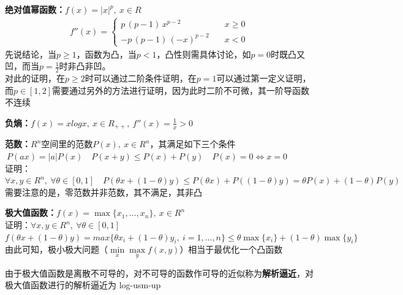 \documentclass[11pt]{ctexart}         %
\begin{document}
\textbf{绝对值幂函数：}$f(x)=\vert x\vert^p,\ x\in R$
\begin{align*}
	f''(x)=
	\begin{cases}
		p\,(p-1)\,x^{p-2}\quad &x\geq 0\\
		-p\,(p-1)\,(-x)^{p-2}\quad &x<0
	\end{cases}
\end{align*}
先说结论，当$p\geq 1$，函数为凸，当$p<1$，凸性则需具体讨论，如$p=0$时既凸又凹，而当$p=\frac{1}{2}$时非凸非凹。\\
对此的证明，在$p\geq 2$时可以通过二阶条件证明，在$p=1$可以通过第一定义证明，而$p\in [1,2]$需要通过另外的方法进行证明，{\color{red}因为此时二阶不可微，其一阶导函数不连续}

\textbf{负熵：}$f(x)=xlogx,\ x\in R_{++},\ f''(x)=\frac{1}{x}>0$

\textbf{范数：}$R^n$空间里的范数$P(x),\ x\in R^n$，其满足如下三个条件\\
\phantom{范数：}$\ P(ax)=\vert a\vert P(x)\quad $$P(x+y)\leq P(x)+P(y)\quad$$P(x)=0\Leftrightarrow x=0$\\
证明：$\forall x,y\in R^n,\ \forall\theta\in[0,1]\quad P(\theta x+(1-\theta)y)\leq P(\theta x)+P((1-\theta)y)=\theta P(x)+(1-\theta)P(y)$\\
需要注意的是，零范数并非范数，其不满足，其非凸

\textbf{极大值函数：}$f(x)=\max\{x_1,\dots,x_n\},\ x\in R^n$\\
证明：$\forall x,y\in R^n,\ \forall\theta\in[0,1]$\\
\phantom{证明：}$f(\theta x+(1-\theta)y)=max\{\theta x_i+(1-\theta)y_i,\ i=1,\dots,n\}\leq \theta \max \{x_i\}+(1-\theta)\max \{y_i\}$\\
由此可知，极小极大问题（$\min\limits_x\max\limits_yf(x,y)$）相当于最优化一个凸函数

由于极大值函数是离散不可导的，对不可导的函数作可导的近似称为\textbf{解析逼近}，对极大值函数进行的解析逼近为 log-usm-up
\end{document}

